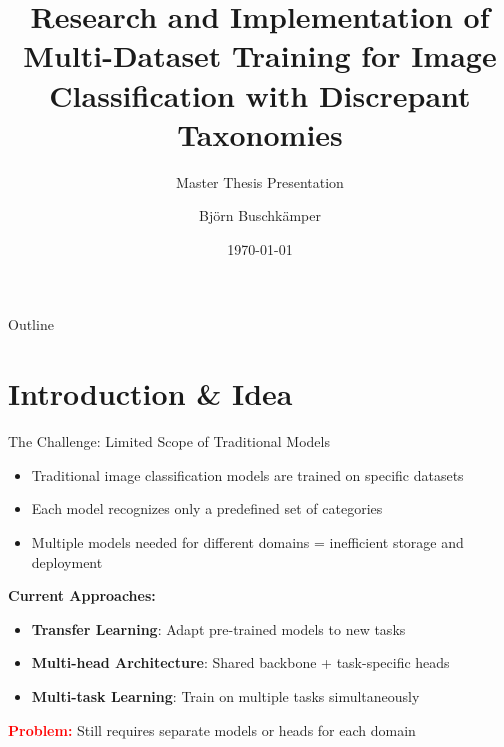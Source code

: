 \documentclass[aspectratio=169]{beamer}
\title{Research and Implementation of Multi-Dataset Training for Image Classification with Discrepant Taxonomies}
\subtitle{Master Thesis Presentation}
\author{Björn Buschkämper}
\institute{Technical Faculty, Bielefeld University}
\date{\today}
\begin{document}
\begin{frame}
    \titlepage
\end{frame}

\begin{frame}{Outline}
    \tableofcontents
\end{frame}

\section{Introduction \& Idea}

\begin{frame}{The Challenge: Limited Scope of Traditional Models}
    \begin{itemize}
        \item Traditional image classification models are trained on specific datasets
        \item Each model recognizes only a predefined set of categories
        \item Multiple models needed for different domains = inefficient storage and deployment
    \end{itemize}

    \vspace{1em}

    \textbf{Current Approaches:}
    \begin{itemize}
        \item \textbf{Transfer Learning}: Adapt pre-trained models to new tasks
        \item \textbf{Multi-head Architecture}: Shared backbone + task-specific heads
        \item \textbf{Multi-task Learning}: Train on multiple tasks simultaneously
    \end{itemize}

    \vspace{1em}

    \textcolor{red}{\textbf{Problem:}} Still requires separate models or heads for each domain
\end{frame}
\end{document}
